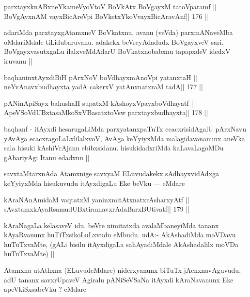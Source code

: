 \begin{shl}
parxtayxknABxneYkameVyoV\s toV BoVkAtx BoVgayxM tatoV\s paramf ||
BoVgAyxnAM vayxBicAreV\s pi BoVketxYkoV\s vayxBicAravAnf\hfill || 176 ||
\end{shl}

\begin{artha}
adariMda parxtayxgAtamxneV BoVkatxnu. avanu (veVda) parxmANaveMba 
oMdariMdale tiLidubaruvanu. adakekx beVreyAdadudx BoVgayxveV sari. BoVgayxvasutxgaLu ilalxveMdAdarU BoVkatxnobabxnu tapapxdeV idedxV iruvanu ||
\end{artha}

\begin{shl}
baqhaninxtAyxdiBiH pArxNoV boVdhayxmAnoV\s pi yatanxtaH ||
neYvAnavxbudhayxta yadA cakerxV yatAnxnatxraM tadA\hfill || 177 ||
\end{shl}

\begin{shl}
pANinA\s\s piSayx bahushaH supatxM kAshoyxV\s payxboVdhayatf ||
ApeVSoVdUBxtasaMkoSxVBasatxtoV\s sw parxtayxbudhayxta\hfill || 178 ||
\end{shl}

\begin{artha}
baqhanf - itAyxdi hesarugaLiMda parxyatanxpaTuTx ecacxrisidAgalU 
pArxNavu yAvAga ecacxragoLaLxlilalxvoV, AvAga keYyiyxMda 
malagidavananunx aneVka sala hisuki kAshiVrAjanu ebibxsidanu. 
hisukidadxriMda kaLavaLagoMDu gAbariyAgi Itanu edadxnu ||
\end{artha}

\begin{artha}
savxtaMtarxnAda Atamxnige savxyaM ELuvudakekx sAdhayxvidAdxga keYyiyxMda 
hisukuvudu itAyxdigaLu Eke beVku --- eMdare 
\end{artha}

\begin{shl}
kAraNAnAmidaM vaqtatxM yaninxmitAtxnatxrAsharxyAtf ||
sAvxtamxkAyaRsamudUBxtiramavxrAdaBarxBUtivatf\hfill || 179 ||
\end{shl}

\begin{artha}
kAraNagaLa kelasaveV idu. beVre nimitatxda avalaMbaneyiMda tananx 
kAyaRvanunx huTiTxsikoLuLxvudu eMbudu. udA:- AkAshadiMda moVDavu 
huTuTxvaMte, (gALi bisilu itAyxdigaLa sahAyadiMdale AkAshadalilx moVDa huTuTxvaMte) ||
\end{artha}

\begin{artha}
Atamxna utAthxna (ELuvudeMdare) niderxyanunx biTuTx jAcnxnavAguvudu. adU tananx savxrUpaveV Agiralu pANiSeVSaNa itAyxdi kAraNavanunx Eke apeVkiSxsabeVku ? eMdare ---
\end{artha}

